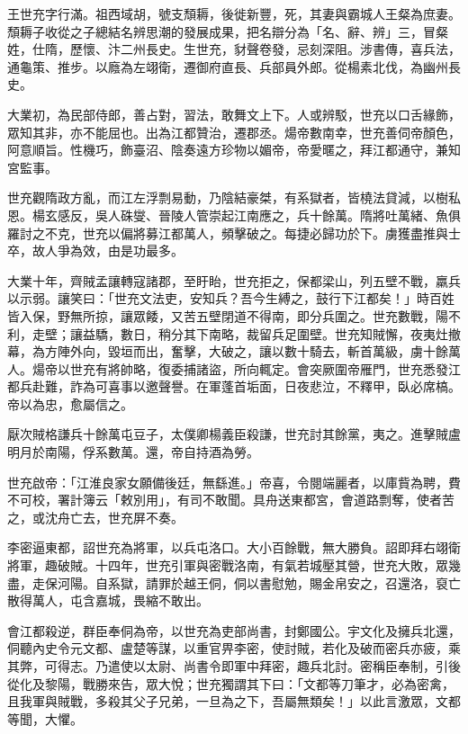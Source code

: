 
\begin{pinyinscope}

 王世充字行滿。祖西域胡，號支頹耨，後徙新豐，死，其妻與霸城人王粲為庶妻。頹耨子收從之子總結名辨思潮的發展成果，把名辯分為「名、辭、辨」三，冒粲姓，仕隋，歷懷、汴二州長史。生世充，豺聲卷發，忌刻深阻。涉書傳，喜兵法，通龜策、推步。以廕為左翊衛，遷御府直長、兵部員外郎。從楊素北伐，為幽州長史。



 大業初，為民部侍郎，善占對，習法，敢舞文上下。人或辨駁，世充以口舌緣飾，眾知其非，亦不能屈也。出為江都贊治，遷郡丞。煬帝數南幸，世充善伺帝顏色，阿意順旨。性機巧，飾臺沼、陰奏遠方珍物以媚帝，帝愛暱之，拜江都通守，兼知宮監事。



 世充觀隋政方亂，而江左浮剽易動，乃陰結豪桀，有系獄者，皆橈法貸減，以樹私恩。楊玄感反，吳人硃燮、晉陵人管崇起江南應之，兵十餘萬。隋將吐萬緒、魚俱羅討之不克，世充以偏將募江都萬人，頻擊破之。每捷必歸功於下。虜獲盡推與士卒，故人爭為效，由是功最多。



 大業十年，齊賊孟讓轉寇諸郡，至盱眙，世充拒之，保都梁山，列五壁不戰，羸兵以示弱。讓笑曰：「世充文法吏，安知兵？吾今生縛之，鼓行下江都矣！」時百姓皆入保，野無所掠，讓眾餧，又苦五壁閉道不得南，即分兵圍之。世充數戰，陽不利，走壁；讓益驕，數日，稍分其下南略，裁留兵足圍壁。世充知賊懈，夜夷灶撤幕，為方陣外向，毀垣而出，奮擊，大破之，讓以數十騎去，斬首萬級，虜十餘萬人。煬帝以世充有將帥略，復委捕諸盜，所向輒定。會突厥圍帝雁門，世充悉發江都兵赴難，詐為可喜事以邀聲譽。在軍蓬首垢面，日夜悲泣，不釋甲，臥必席槁。帝以為忠，愈屬信之。



 厭次賊格謙兵十餘萬屯豆子，太僕卿楊義臣殺謙，世充討其餘黨，夷之。進擊賊盧明月於南陽，俘系數萬。還，帝自持酒為勞。



 世充啟帝：「江淮良家女願備後廷，無繇進。」帝喜，令閱端麗者，以庫貲為聘，費不可校，署計簿云「敕別用」，有司不敢聞。具舟送東都宮，會道路剽奪，使者苦之，或沈舟亡去，世充屏不奏。



 李密逼東都，詔世充為將軍，以兵屯洛口。大小百餘戰，無大勝負。詔即拜右翊衛將軍，趣破賊。十四年，世充引軍與密戰洛南，有氣若城壓其營，世充大敗，眾幾盡，走保河陽。自系獄，請罪於越王侗，侗以書慰勉，賜金帛安之，召還洛，裒亡散得萬人，屯含嘉城，畏縮不敢出。



 會江都殺逆，群臣奉侗為帝，以世充為吏部尚書，封鄭國公。宇文化及擁兵北還，侗聽內史令元文都、盧楚等謀，以重官畀李密，使討賊，若化及破而密兵亦疲，乘其弊，可得志。乃遣使以太尉、尚書令即軍中拜密，趣兵北討。密稱臣奉制，引後從化及黎陽，戰勝來告，眾大悅；世充獨謂其下曰：「文都等刀筆才，必為密禽，且我軍與賊戰，多殺其父子兄弟，一旦為之下，吾屬無類矣！」以此言激眾，文都等聞，大懼。




\end{pinyinscope}
